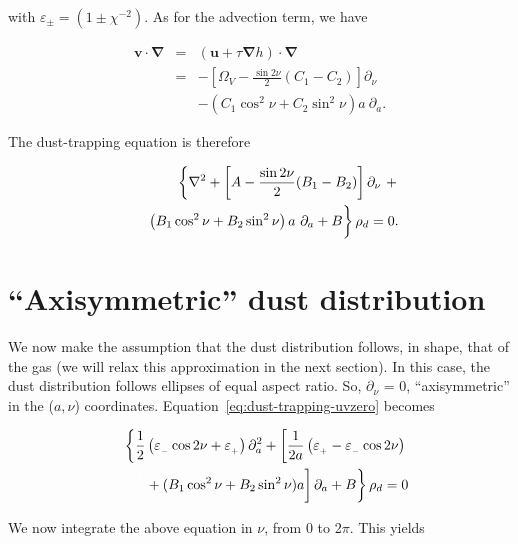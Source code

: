 \documentclass[apj]{emulateapj}
\renewcommand{\v}[1]{{\boldsymbol{#1}}} %
\def\white#1{\textcolor{white}{#1}}
\newcommand{\del}{\v{\nabla}}
\newcommand{\grad}{\del}
\newcommand{\Laplace}{\nabla^2}
\newcommand{\beq}{\begin{equation}}
\newcommand{\eeq}{\end{equation}}
\newcommand{\beqn}{\begin{eqnarray}}
\newcommand{\eeqn}{\end{eqnarray}}
\newcommand{\epsp}{\varepsilon_{_{+}}}
\newcommand{\epsm}{\varepsilon_{_{-}}}
\begin{document}
\noindent with $\varepsilon_{\pm} = (1 \pm \chi^{-2})$.  As for the advection term, we have 

\beqn
\v{v}\cdot\del &=& (\v{u} + \tau \grad h) \cdot \del \nonumber \\
&=& - \left[\varOmega_V - \frac{\sin2\nu}{2}  (C_1 -  C_2)\right]\partial_\nu \nonumber \\
&&- \left( C_1 \cos^2\nu   + C_2\sin^2\nu \right) a \ \partial_a. \label{eq:advection-term}
\eeqn


The dust-trapping equation is therefore 


\beqn 
&& \left\{ \Laplace{} + \left[A - \frac{\sin2\nu}{2}  (B_1 - B_2)\right]\partial_\nu \ +  \right.  \nonumber\\
&& \left. \white{\frac{1}{1}}\left( B_1 \cos^2\nu   + B_2\sin^2\nu
  \right) a \ \partial_a  + B \right\} \rho_d = 0. \label{eq:dust-trapping-uvzero}
\eeqn



\section{``Axisymmetric'' dust distribution}

We now make the assumption that the dust distribution follows, in shape, that of
the gas (we will relax this approximation in the next section). In this case, the
dust distribution follows ellipses of equal aspect ratio. So,
$\partial_\nu$ = 0, ``axisymmetric'' in the ($a,\nu$)
coordinates. Equation~\ref{eq:dust-trapping-uvzero} becomes

\beqn
&&\left\{\frac{1}{2}\left(\epsm \cos 2\nu +\epsp\right) \partial^2_a  +  \left[\frac{1}{2a}\left( \epsp - \epsm\cos 2\nu\right) \right.\right. \nonumber\\
&&\left.\left.\white{\frac{1}{1}}+ (B_1\cos^2\nu +  B_2\sin^2\nu)a\right] \partial_a  + B\right\} \rho_d = 0 
\eeqn

We now integrate the above equation in $\nu$, from 0 to 2$\pi$. This yields

\end{document}
